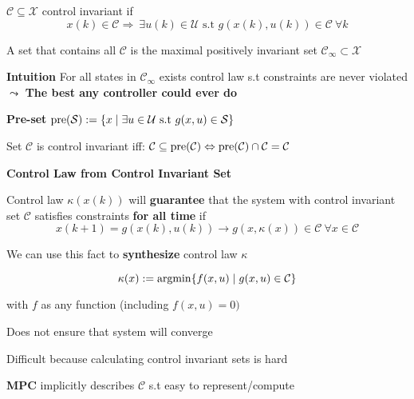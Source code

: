 \begin{definition}
	$\mathcal{C} \subseteq \mathcal{X}$ control invariant if
	$$x(k) \in \mathcal{C} \Rightarrow
		\ \exists u(k) \in \mathcal{U} \text{ s.t }
		g(x(k),u(k))\in\mathcal{C} \ \forall k$$
\end{definition}

\begin{definition}
	A set that contains all $\mathcal{C}$
	is the maximal positively invariant set
	$\mathcal{C}_\infty \subset \mathcal{X}$

	\textbf{Intuition} For all states in $\mathcal{C}_\infty$
	exists control law s.t constraints are never violated
	$\leadsto$ \textbf{The best any controller could ever do}
\end{definition}

\textbf{Pre-set}
$\operatorname{pre}(\mathcal{S}):=\{x \mid \exists u\in\mathcal{U}
	\text{ s.t } g(x,u) \in \mathcal{S}\}$

Set $\mathcal{C}$ is control invariant iff:
$\mathcal{C}\subseteq\operatorname{pre}(\mathcal{C})
	\Leftrightarrow
	\operatorname{pre}(\mathcal{C})\cap\mathcal{C} = \mathcal{C}$

\begin{sstTitleBox}[BrickRed]{\center\textbf{\large
			Control Law from Control Invariant Set
		}}

	\begin{sstOnlyFrame}[BrickRed]

		\begin{centering}
			Control law $\kappa(x(k))$ will \textbf{guarantee}
			that the system
			with control invariant set $\mathcal{C}$
			satisfies constraints \textbf{for all time} if
			$$x(k+1)=g(x(k),u(k))\to
				g(x,\kappa(x)) \in \mathcal{C} \ \forall x \in \mathcal{C}$$

			We can use this fact to \textbf{synthesize}
			control law $\kappa$

		\end{centering}
		\begin{sstFullFrame}[BrickRed]\color{white}
			\[
				\kappa(x):=\operatorname{argmin}\{f(x,u) \mid g(x,u)\in\mathcal{C}\}
			\]
		\end{sstFullFrame}

		with $f$ as any function (including $f(x,u)=0)$
	\end{sstOnlyFrame}

	\begin{sstOnlyFrame}[BrickRed]
		Does not ensure that system will converge

		Difficult because calculating control invariant sets is hard

		\textbf{MPC} implicitly describes $\mathcal{C}$
		s.t easy to represent/compute
	\end{sstOnlyFrame}
\end{sstTitleBox}

